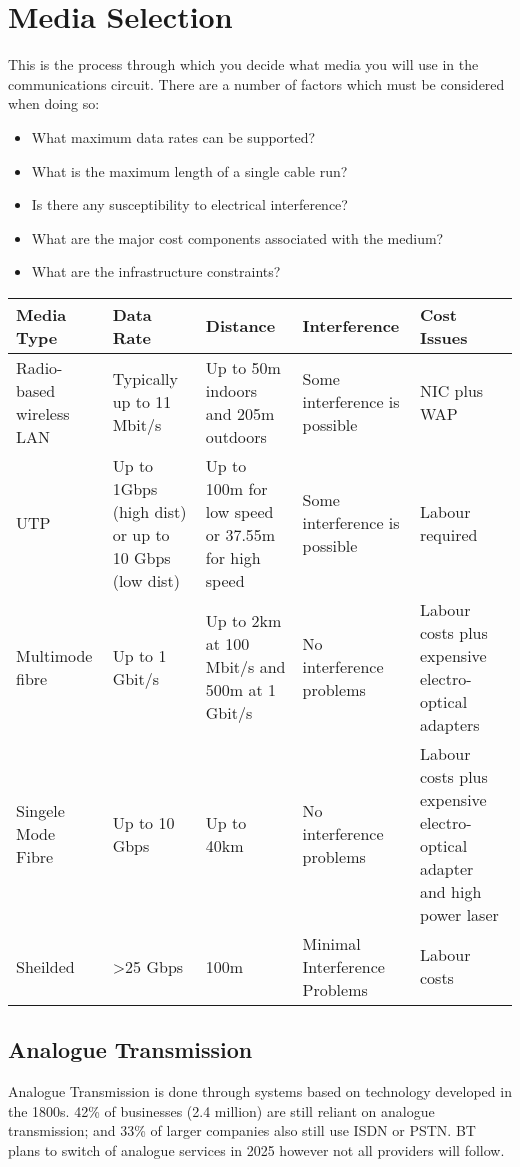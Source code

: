 
\section*{Media Selection}
This is the process through which you decide what media you will use in the communications circuit. There are a number of factors which must be considered when doing so:
\begin{itemize}
    \item What maximum data rates can be supported?
    \item What is the maximum length of a single cable run?
    \item Is there any susceptibility to electrical interference?
    \item What are the major cost components associated with the medium?
    \item What are the infrastructure constraints?
\end{itemize}
\begin{table}[H]
    \centering
    \begin{tabularx}{0.9\textwidth}{X|XXXX}
    Media Type & Data Rate & Distance & Interference & Cost Issues \\
    \hline
    Radio-based wireless LAN & Typically up to 11 Mbit/s & Up to 50m indoors and 205m outdoors & Some interference is possible & NIC plus WAP \\
    UTP & Up to 1Gbps (high dist) or up to 10 Gbps (low dist) & Up to 100m for low speed or 37.55m for high speed & Some interference is possible & Labour required \\
    Multimode fibre & Up to 1 Gbit/s & Up to 2km at 100 Mbit/s and 500m at 1 Gbit/s & No interference problems & Labour costs plus expensive electro-optical adapters \\
    Singele Mode Fibre & Up to 10 Gbps & Up to 40km & No interference problems & Labour costs plus expensive electro-optical adapter and high power laser \\
    Sheilded & \textgreater 25 Gbps & 100m & Minimal Interference Problems & Labour costs
    \end{tabularx}
\end{table}

\subsection*{Analogue Transmission}
Analogue Transmission is done through systems based on technology developed in the 1800s. 42\% of businesses (2.4 million) are still reliant on analogue transmission; and 33\% of larger companies also still use ISDN or PSTN. BT plans to switch of analogue services in 2025 however not all providers will follow. 

